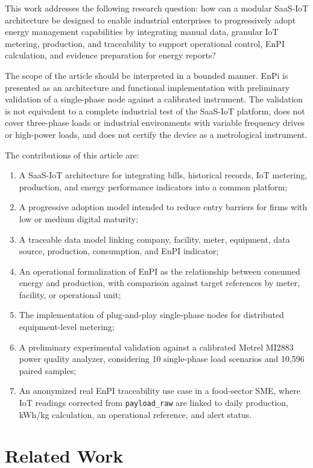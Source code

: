 \documentclass{ieeeaccess}
\begin{document}
This work addresses the following research question: how can a modular SaaS-IoT architecture be designed to enable industrial enterprises to progressively adopt energy management capabilities by integrating manual data, granular IoT metering, production, and traceability to support operational control, EnPI calculation, and evidence preparation for energy reports?

The scope of the article should be interpreted in a bounded manner. EnPi is presented as an architecture and functional implementation with preliminary validation of a single-phase node against a calibrated instrument. The validation is not equivalent to a complete industrial test of the SaaS-IoT platform, does not cover three-phase loads or industrial environments with variable frequency drives or high-power loads, and does not certify the device as a metrological instrument.

The contributions of this article are:
\begin{enumerate}
\item A SaaS-IoT architecture for integrating bills, historical records, IoT metering, production, and energy performance indicators into a common platform;
\item A progressive adoption model intended to reduce entry barriers for firms with low or medium digital maturity;
\item A traceable data model linking company, facility, meter, equipment, data source, production, consumption, and EnPI indicator;
\item An operational formalization of EnPI as the relationship between consumed energy and production, with comparison against target references by meter, facility, or operational unit;
\item The implementation of plug-and-play single-phase nodes for distributed equipment-level metering;
\item A preliminary experimental validation against a calibrated Metrel MI2883 power quality analyzer, considering 10 single-phase load scenarios and 10,596 paired samples;
\item An anonymized real EnPI traceability use case in a food-sector SME, where IoT readings corrected from \texttt{payload\_raw} are linked to daily production, kWh/kg calculation, an operational reference, and alert status.
\end{enumerate}

\section{Related Work}
\label{sec:related-work}
\end{document}
